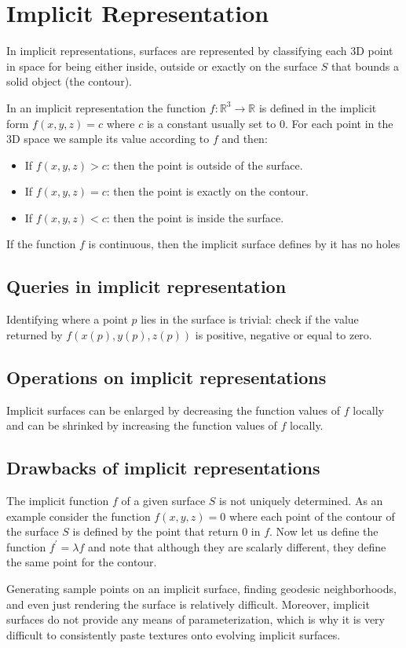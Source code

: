 \section{Implicit Representation}
In implicit representations, surfaces are represented by classifying each 3D point in space for being either inside, outside or exactly on the surface $S$ that bounds a solid object (the contour).\par
In an implicit representation the function $f: \mathbb{R}^{3} \rightarrow \mathbb{R}$ is defined in the implicit form $f(x,y,z) = c$ where $c$ is a constant usually set to $0$. For each point in the 3D space we sample its value according to $f$ and then:
\begin{itemize}
    \item If $f(x,y,z) > c$: then the point is outside of the surface.
    \item If $f(x,y,z) = c$: then the point is exactly on the contour.
    \item If $f(x,y,z) < c$: then the point is inside the surface.
\end{itemize}
If the function $f$ is continuous, then the implicit surface defines by it has no holes 

\subsection{Queries in implicit representation}
Identifying where a point $p$ lies in the surface is trivial: check if the value returned by $f(x(p), y(p), z(p))$ is positive, negative or equal to zero.

\subsection{Operations on implicit representations}
Implicit surfaces can be enlarged by decreasing the function values of $f$ locally and can be shrinked by increasing the function values of $f$ locally.

\subsection{Drawbacks of implicit representations}
The implicit function $f$ of a given surface $S$ is not uniquely determined. As an example consider the function $f(x,y,z) = 0$ where each point of the contour of the surface $S$ is defined by the point that return 0 in $f$. Now let us define the function $f^{'} = \lambda f$ and note that although they are scalarly different, they define the same point for the contour.\par
Generating sample points on an implicit surface, finding geodesic neighborhoods, and even just rendering the surface is relatively difficult. Moreover, implicit surfaces do not provide any means of parameterization, which is why it is very difficult to consistently paste textures onto evolving implicit surfaces.

